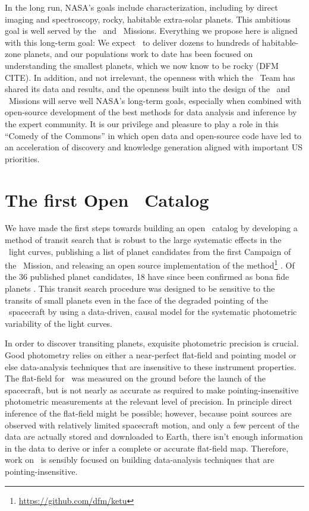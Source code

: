 \documentclass[12pt,preprint]{aastex}
\begin{document}
In the long run, NASA's goals include characterization, including by
direct imaging and spectroscopy, rocky, habitable extra-solar planets.
This ambitious goal is well served by the \kepler\ and \kt\ Missions.
Everything we propose here is aligned with this long-term goal:
We expect \kt\ to deliver dozens to hundreds of habitable-zone
planets, and our populations work to date has been focused on
understanding the smallest planets, which we now know to be rocky (DFM
CITE).
In addition, and not irrelevant, the openness with which the
\kepler\ Team has shared its data and results, and the openness built
into the design of the \kt\ and \tess\ Missions will serve well NASA's
long-term goals, especially when combined with open-source development
of the best methods for data analysis and inference by the expert
community.
It is our privilege and pleasure to play a role in this ``Comedy of
the Commons'' in which open data and open-source code have led to an
acceleration of discovery and knowledge generation aligned with
important US priorities.

\section{The first Open \ketu\ Catalog}

We have made the first steps towards building an open \ketu\ catalog by
developing a method of transit search that is robust to the large systematic
effects in the \ketu\ light curves, publishing a list of planet candidates
from the first Campaign of the \ketu\ Mission, and releasing an open source
implementation of the method\footnote{\url{https://github.com/dfm/ketu}}
\citep{Foreman-Mackey:2015}.
Of the 36 published planet candidates, 18 have since been confirmed as bona
fide planets \citep{Armstrong:2015, Montet:2015}.
This transit search procedure was designed to be sensitive to the transits of
small planets even in the face of the degraded pointing of the \kepler\
spacecraft by using a data-driven, causal model for the systematic photometric
variability of the light curves.



In order to discover transiting planets, exquisite photometric precision is
crucial.
Good photometry relies on either a near-perfect flat-field
and pointing model or else data-analysis techniques that are
insensitive to these instrument properties.
The flat-field for \kepler\ was measured on the ground before the launch of
the spacecraft, but is not nearly as accurate as required to make
pointing-insensitive photometric measurements at the relevant level of
precision.
In principle direct inference of the flat-field might be possible;
however, because point sources are observed with relatively limited
spacecraft motion, and only a few percent of the data are actually stored and
downloaded to Earth, there isn't enough information in the data to derive or
infer a complete or accurate flat-field map.
Therefore, work on \KT\ is sensibly focused on building data-analysis
techniques that are pointing-insensitive.
\end{document}
